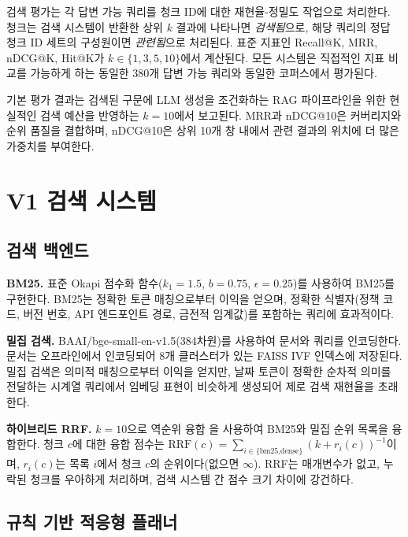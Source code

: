 \documentclass[11pt, a4paper]{article}
\begin{document}
검색 평가는 각 답변 가능 쿼리를 청크 ID에 대한 재현율-정밀도 작업으로 처리한다. 청크는 검색 시스템이 반환한 상위 $k$ 결과에 나타나면 \emph{검색됨}으로, 해당 쿼리의 정답 청크 ID 세트의 구성원이면 \emph{관련됨}으로 처리된다. 표준 지표인 Recall@K, MRR, nDCG@K, Hit@K가 $k \in \{1, 3, 5, 10\}$에서 계산된다. 모든 시스템은 직접적인 지표 비교를 가능하게 하는 동일한 380개 답변 가능 쿼리와 동일한 코퍼스에서 평가된다.

기본 평가 결과는 검색된 구문에 LLM 생성을 조건화하는 RAG 파이프라인을 위한 현실적인 검색 예산을 반영하는 $k=10$에서 보고된다. MRR과 nDCG@10은 커버리지와 순위 품질을 결합하며, nDCG@10은 상위 10개 창 내에서 관련 결과의 위치에 더 많은 가중치를 부여한다.

\section{V1 검색 시스템}
\label{sec:v1}

\subsection{검색 백엔드}

\textbf{BM25.} 표준 Okapi 점수화 함수($k_1{=}1.5$, $b{=}0.75$, $\epsilon{=}0.25$)를 사용하여 BM25를 구현한다. BM25는 정확한 토큰 매칭으로부터 이익을 얻으며, 정확한 식별자(정책 코드, 버전 번호, API 엔드포인트 경로, 금전적 임계값)를 포함하는 쿼리에 효과적이다.

\textbf{밀집 검색.} BAAI/bge-small-en-v1.5(384차원)를 사용하여 문서와 쿼리를 인코딩한다. 문서는 오프라인에서 인코딩되어 8개 클러스터가 있는 FAISS IVF 인덱스에 저장된다. 밀집 검색은 의미적 매칭으로부터 이익을 얻지만, 날짜 토큰이 정확한 순차적 의미를 전달하는 시계열 쿼리에서 임베딩 표현이 비슷하게 생성되어 제로 검색 재현율을 초래한다.

\textbf{하이브리드 RRF.} $k{=}10$으로 역순위 융합 \citep{cormack2009rrf}을 사용하여 BM25와 밀집 순위 목록을 융합한다. 청크 $c$에 대한 융합 점수는 $\text{RRF}(c) = \sum_{i \in \{\text{bm25,dense}\}} (k + r_i(c))^{-1}$이며, $r_i(c)$는 목록 $i$에서 청크 $c$의 순위이다(없으면 $\infty$). RRF는 매개변수가 없고, 누락된 청크를 우아하게 처리하며, 검색 시스템 간 점수 크기 차이에 강건하다.

\subsection{규칙 기반 적응형 플래너}
\end{document}
